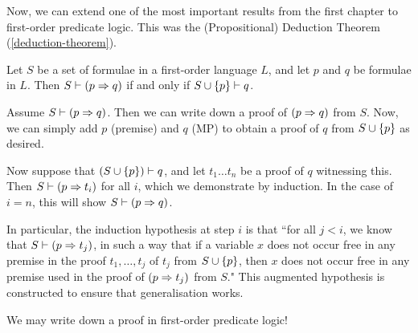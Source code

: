\documentclass{article}
\begin{document}
Now, we can extend one of the most important results from the first chapter to first-order predicate logic. This was the (Propositional) Deduction Theorem (\ref{deduction-theorem}).

\begin{theorem}
    Let $S$ be a set of formulae in a first-order language $L$, and let $p$ and $q$ be formulae in $L$.
    Then $S \vdash (p \Rightarrow q)$ if and only if $S \cup \left\lbrace p \right\rbrace \vdash q$.
\end{theorem}

\begin{prf}
    Assume $S \vdash (p \Rightarrow q)$. Then we can write down a proof of $(p \Rightarrow q)$ from $S$. Now, we can simply add $p$ (premise) and $q$ (MP) to obtain a proof of $q$ from $S \cup \left\lbrace p \right\rbrace$ as desired.
    
    Now suppose that $(S \cup \left\lbrace p \right\rbrace) \vdash q$, and let $t_1 \dots t_n$ be a proof of $q$ witnessing this. Then $S \vdash (p \Rightarrow t_i)$ for all $i$, which we demonstrate by induction. In the case of $i = n$, this will show $S \vdash (p \Rightarrow q)$.
    
    In particular, the induction hypothesis at step $i$ is that
    ``for all $j < i$, we know that $S \vdash (p \Rightarrow t_j)$,
    in such a way that if a variable $x$ does not occur free in any premise in the proof $t_1, \dots, t_j$ of $t_j$ from $S \cup \left\lbrace p \right\rbrace$,
    then $x$ does not occur free in any premise used in the proof of $(p \Rightarrow t_j)$ from $S$."
    This augmented hypothesis is constructed to ensure that generalisation works.
\end{prf}

We may write down a proof in first-order predicate logic!
\end{document}
